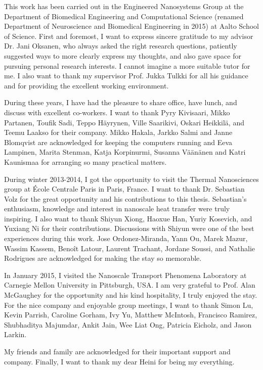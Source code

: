 \documentclass[dissertation]{aaltoseries}
\begin{document}
\author{Kimmo S\"a\"askilahti}
\begin{preface}
 This work has been carried out in the Engineered Nanosystems Group at the Department of Biomedical Engineering and Computational Science (renamed Department of Neuroscience and Biomedical Engineering in 2015) at Aalto School of Science. First and foremost, I want to express sincere gratitude to my advisor Dr. Jani Oksanen, who always asked the right research questions, patiently suggested ways to more clearly express my thoughts, and also gave space for pursuing personal research interests. I cannot imagine a more suitable tutor for me. I also want to thank my supervisor Prof. Jukka Tulkki for all his guidance and for providing the excellent working environment.

During these years, I have had the pleasure to share office, have lunch, and discuss with excellent co-workers. I want to thank Pyry Kivisaari, Mikko Partanen, Toufik Sadi, Teppo H\"ayrynen, Ville Saarikivi, Oskari Heikkil\"a, and Teemu Laakso for their company. Mikko Hakala, Jarkko Salmi and Janne Blomqvist are acknowledged for keeping the computers running and Eeva Lampinen, Marita Stenman, Katja Korpinurmi, Susanna V\"a\"an\"anen and Katri Kaunismaa for arranging so many practical matters. 

During winter 2013-2014, I got the opportunity to visit the Thermal Nanosciences group at \'Ecole Centrale Paris in Paris, France. I want to thank Dr. Sebastian Volz for the great opportunity and his contributions to this thesis. Sebastian's enthusiasm, knowledge and interest in nanoscale heat transfer were truly inspiring. I also want to thank Shiyun Xiong, Haoxue Han, Yuriy Kosevich, and Yuxiang Ni for their contributions. Discussions with Shiyun were one of the best experiences during this work. Jose Ordonez-Miranda, Yann Ou, Marek Mazur, Wassim Kassem, Beno\^it Latour, Laurent Trachant, Jordane Soussi, and Nathalie Rodrigues are acknowledged for making the stay so memorable. 

In January 2015, I visited the Nanoscale Transport Phenomena Laboratory at Carnegie Mellon University in Pittsburgh, USA. I am very grateful to Prof. Alan McGaughey for the opportunity and his kind hospitality, I truly enjoyed the stay. For the nice company and enjoyable group meetings, I want to thank Simon Lu, Kevin Parrish, Caroline Gorham, Ivy Yu, Matthew McIntosh, Francisco Ramirez, Shubhaditya Majumdar, Ankit Jain, Wee Liat Ong, Patricia Eicholz, and Jason Larkin.

My friends and family are acknowledged for their important support and company. Finally, I want to thank my dear Heini for being my everything.

\end{preface}
%
\end{document}
